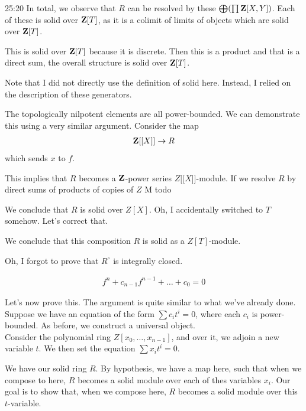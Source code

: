 \begin{unfinished}{25:20}
In total, we observe that $R$ can be resolved by these $\bigoplus(\prod \mathbf Z [X,Y])$.  Each of these is solid over $\mathbf Z[T]$, as it is a colimit of limits of objects which are solid over $\mathbf Z[T]$. 


This is solid over $\mathbf Z[T]$ because it is discrete. Then this is a product and that is a direct sum, the overall structure is solid over $\mathbf Z[T]$.

Note that I did not directly use the definition of solid here. Instead, I relied on the description of these generators.

The topologically nilpotent elements are all power-bounded. We can demonstrate this using a very similar argument. Consider the map
\begin{align*} 
\mathbf Z[[X]] \to R
\end{align*}
which sends $x$ to $f$. 

This implies that $R$ becomes a $\mathbf Z$-power series $Z[[X$]]-module. 
If we resolve $R$ by direct sums of products of copies of $Z$
M todo

% 
We conclude that $R$ is solid over $Z[X]$. Oh, I accidentally switched to $T$ somehow. Let's correct that.

We conclude that this composition $R$ is solid as a $Z[T]$-module. 

Oh, I forgot to prove that $R^\circ$ is integrally closed.

\begin{align*} 
f^n + c_{n-1}f^{n-1} + \ldots + c_0 = 0
\end{align*}
\eq

% 
Let's now prove this. The argument is quite similar to what we've already done.
Suppose we have an equation of the form $\sum c_i t^i = 0$, where each $c_i$ is power-bounded. As before, we construct a universal object.\\

Consider the polynomial ring $Z[x_0, \dots, x_{n-1}]$, and over it, we adjoin a new variable $t$. We then set the equation $\sum x_i t^i = 0$.

We have our solid ring $R$. By hypothesis, we have a map here, such that when we compose to here, $R$ becomes a solid module over each of thes variables $x_i$. Our goal is to show that, when we compose here, $R$ becomes a solid module over this $t$-variable.


\end{unfinished}
